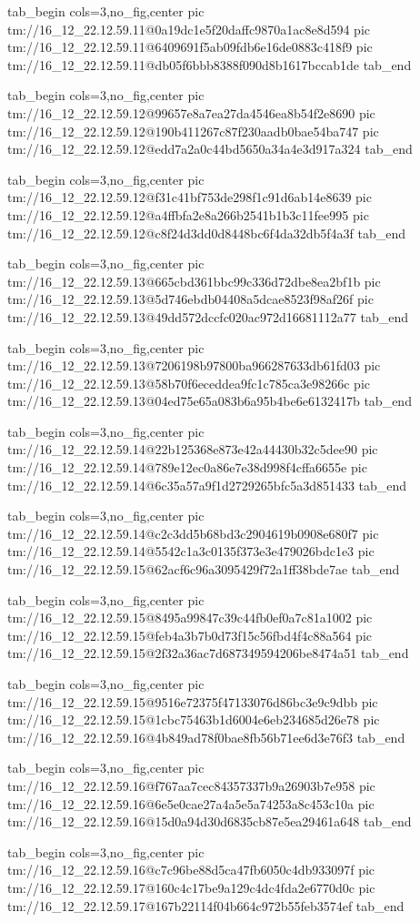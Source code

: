 \ifcmt
  tab_begin cols=3,no_fig,center
    pic tm://16_12_22.12.59.11@0a19dc1e5f20daffc9870a1ac8e8d594
    pic tm://16_12_22.12.59.11@6409691f5ab09fdb6e16de0883c418f9
    pic tm://16_12_22.12.59.11@db05f6bbb8388f090d8b1617bccab1de
  tab_end
\fi


\ifcmt
  tab_begin cols=3,no_fig,center
    pic tm://16_12_22.12.59.12@99657e8a7ea27da4546ea8b54f2e8690
    pic tm://16_12_22.12.59.12@190b411267c87f230aadb0bae54ba747
    pic tm://16_12_22.12.59.12@edd7a2a0c44bd5650a34a4e3d917a324
  tab_end
\fi


\ifcmt
  tab_begin cols=3,no_fig,center
    pic tm://16_12_22.12.59.12@f31c41bf753de298f1c91d6ab14e8639
    pic tm://16_12_22.12.59.12@a4ffbfa2e8a266b2541b1b3c11fee995
    pic tm://16_12_22.12.59.12@c8f24d3dd0d8448bc6f4da32db5f4a3f
  tab_end
\fi


\ifcmt
  tab_begin cols=3,no_fig,center
    pic tm://16_12_22.12.59.13@665cbd361bbc99c336d72dbe8ea2bf1b
    pic tm://16_12_22.12.59.13@5d746ebdb04408a5dcae8523f98af26f
    pic tm://16_12_22.12.59.13@49dd572dccfc020ac972d16681112a77
  tab_end
\fi


\ifcmt
  tab_begin cols=3,no_fig,center
    pic tm://16_12_22.12.59.13@7206198b97800ba966287633db61fd03
    pic tm://16_12_22.12.59.13@58b70f6eceddea9fc1c785ca3e98266c
    pic tm://16_12_22.12.59.13@04ed75e65a083b6a95b4be6e6132417b
  tab_end
\fi


\ifcmt
  tab_begin cols=3,no_fig,center
    pic tm://16_12_22.12.59.14@22b125368e873e42a44430b32c5dee90
    pic tm://16_12_22.12.59.14@789e12ec0a86e7e38d998f4cffa6655e
    pic tm://16_12_22.12.59.14@6c35a57a9f1d2729265bfc5a3d851433
  tab_end
\fi


\ifcmt
  tab_begin cols=3,no_fig,center
    pic tm://16_12_22.12.59.14@c2c3dd5b68bd3c2904619b0908e680f7
    pic tm://16_12_22.12.59.14@5542c1a3c0135f373e3e479026bdc1e3
    pic tm://16_12_22.12.59.15@62acf6c96a3095429f72a1ff38bde7ae
  tab_end
\fi


\ifcmt
  tab_begin cols=3,no_fig,center
    pic tm://16_12_22.12.59.15@8495a99847c39c44fb0ef0a7c81a1002
    pic tm://16_12_22.12.59.15@feb4a3b7b0d73f15c56fbd4f4c88a564
    pic tm://16_12_22.12.59.15@2f32a36ac7d687349594206be8474a51
  tab_end
\fi


\ifcmt
  tab_begin cols=3,no_fig,center
    pic tm://16_12_22.12.59.15@9516e72375f47133076d86bc3e9c9dbb
    pic tm://16_12_22.12.59.15@1cbc75463b1d6004e6eb234685d26e78
    pic tm://16_12_22.12.59.16@4b849ad78f0bae8fb56b71ee6d3e76f3
  tab_end
\fi


\ifcmt
  tab_begin cols=3,no_fig,center
    pic tm://16_12_22.12.59.16@f767aa7cec84357337b9a26903b7e958
    pic tm://16_12_22.12.59.16@6e5e0cae27a4a5e5a74253a8c453c10a
    pic tm://16_12_22.12.59.16@15d0a94d30d6835cb87e5ea29461a648
  tab_end
\fi


\ifcmt
  tab_begin cols=3,no_fig,center
    pic tm://16_12_22.12.59.16@c7c96be88d5ca47fb6050c4db933097f
    pic tm://16_12_22.12.59.17@160c4c17be9a129c4dc4fda2e6770d0c
    pic tm://16_12_22.12.59.17@167b22114f04b664c972b55feb3574ef
  tab_end
\fi

